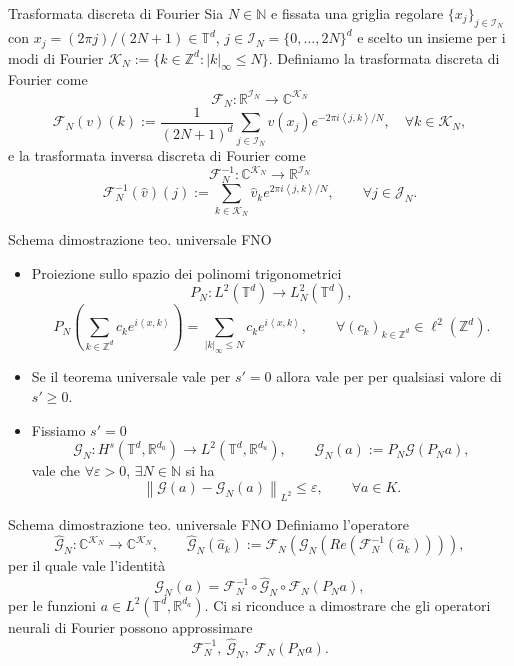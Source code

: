 \documentclass{beamer}
\newcommand{\numberset}{\mathbb}
\newcommand{\N}{\numberset{N}}
\newcommand{\Z}{\numberset{Z}}
\newcommand{\R}{\numberset{R}}
\newcommand{\C}{\numberset{C}}
\begin{document}

\begin{frame}[noframenumbering]{Trasformata discreta di Fourier}
	Sia $ N \in \N $ e fissata una griglia regolare $ \{x_j\}_{j \in \mathcal{I}_N} $ con $ x_j = (2\pi j)/(2N+1) \in \mathbb{T}^d $, $ j \in \mathcal{I}_N = \{0, \dots, 2N\}^{d} $ e scelto un insieme per i modi di Fourier $\mathcal{K}_N := \{k \in \Z^d : |k|_{\infty} \le N\}$.
	Definiamo la trasformata discreta di Fourier come
	\[ \mathcal{F}_{N}: \R^{\mathcal{I}_N} \to \C^{\mathcal{K}_N}\]\[ \mathcal{F}_{N}(v)(k) := \frac{1}{(2N+1)^{d}} \sum_{j \in \mathcal{I}_N}v(x_j) e^{-2\pi i \left\langle j, k \right\rangle/N }, \quad \forall k \in \mathcal{K}_N, \]
	e la trasformata inversa discreta di Fourier come
	\[ \mathcal{F}_{N}^{-1}: \C^{\mathcal{K}_N} \to \R^{\mathcal{I}_N}\]\[ \mathcal{F}_{N}^{-1}(\widehat{v})(j) := \sum_{k \in \mathcal{K}_N} \widehat{v}_k e^{2\pi i \left\langle j, k \right\rangle/N }, \qquad \forall j \in \mathcal{J}_N. \]
\end{frame}


\begin{frame}[noframenumbering]{Schema dimostrazione teo. universale FNO}
	\centering
	\begin{itemize}
		\item Proiezione sullo spazio dei polinomi trigonometrici
		\[ P_N: L^{2}(\mathbb{T}^d) \to L^{2}_N(\mathbb{T}^d),  \]
		\[ P_N\left(\sum_{k \in \Z^d} c_k e^{i \left\langle x, k \right\rangle } \right) = \sum_{|k|_{\infty}\le N} c_k e^{i \left\langle x, k \right\rangle }, \qquad \forall (c_k)_{k \in \Z^d} \in \ell^2(\Z^d). \]
		\item Se il teorema universale vale per $ s'=0 $ allora vale per per qualsiasi valore di $ s' \ge 0 $.
		\item Fissiamo $ s' = 0 $  \[ \mathcal{G}_{N}: H^{s}(\mathbb{T}^d, \R^{d_a}) \to L^2(\mathbb{T}^d, \R^{d_u}), \qquad \mathcal{G}_{N}(a):= P_N  \mathcal{G} (P_Na), \]
		vale che $ \forall \varepsilon > 0 $, $ \exists N \in \N $ si ha
		\[ \left\|\mathcal{G}(a) - \mathcal{G}_N(a) \right\|_{L^2} \le \varepsilon, \qquad \forall a \in K. \]
	\end{itemize}
\end{frame}


\begin{frame}[noframenumbering]{Schema dimostrazione teo. universale FNO}
	Definiamo l'operatore
	\[ \widehat{\mathcal{G}}_N: \C^{\mathcal{K}_N} \to\C^{\mathcal{K}_N}, \qquad \widehat{\mathcal{G}}_N(\widehat{a}_k) := \mathcal{F}_N (\mathcal{G}_N ( Re (\mathcal{F}_N^{-1}(\widehat{a}_k)))), \]
	per il quale vale l'identità
	\[ \mathcal{G}_N (a) = \mathcal{F}_N^{-1} \circ \widehat{\mathcal{G}}_N \circ \mathcal{F}_N (P_Na), \]
	per le funzioni $  a \in L^2(\mathbb{T}^d, \R^{d_a}) $. Ci si riconduce a dimostrare che gli operatori neurali di Fourier possono approssimare
	\[ \mathcal{F}_N^{-1}, \ \widehat{\mathcal{G}}_N , \ \mathcal{F}_N (P_Na). \]
\end{frame}
\end{document}
